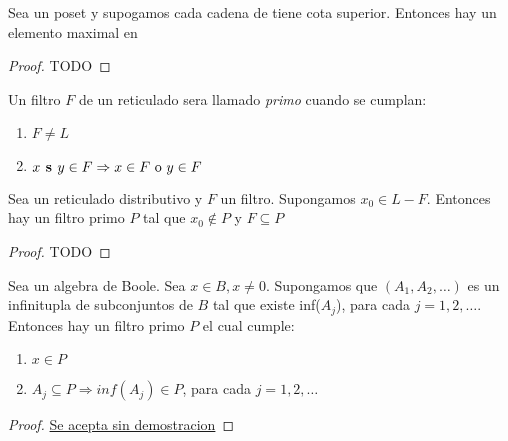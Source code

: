 \begin{lemma}[Zorn]
  Sea \poset un poset y supogamos cada cadena de \poset tiene cota superior. Entonces
  hay un elemento maximal en \poset
\end{lemma}
\begin{proof}
  TODO
\end{proof}

\begin{definition}
  Un filtro $F$ de un reticulado \reticulAlg sera llamado \emph{primo} cuando se cumplan:
  \begin{enumerate}
    \item $F \neq L$
    \item $x\textbf{ s }y \in F \Rightarrow x \in F \text{ o } y \in F$
  \end{enumerate}
\end{definition}

\begin{theorem}
  Sea \reticulAlg un reticulado distributivo y $F$ un filtro. Supongamos $x_0 \in L - F$. Entonces hay un filtro primo
  $P$ tal que $x_0 \notin P$ y $F \subseteq P$
\end{theorem}
\begin{proof}
  TODO
\end{proof}

\begin{theorem}
  Sea \algBoole un algebra de Boole. Sea $x \in B, x \neq 0$. Supongamos que $(A_1, A_2, \dots)$ es un infinitupla 
  de subconjuntos de $B$ tal que existe inf($A_j$), para cada $j = 1, 2, \dots$. Entonces hay un filtro primo $P$ 
  el cual cumple:
  \begin{enumerate}
    \item $x \in P$
    \item $A_j \subseteq P \Rightarrow inf(A_j) \in P$, para cada $j = 1, 2, \dots$
  \end{enumerate}
\end{theorem}
\begin{proof}
  \underline{Se acepta sin demostracion}
\end{proof}
